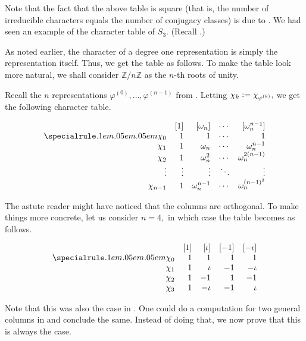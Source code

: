 Note that the fact that the above table is square (that is, the number of irreducible characters equals the number of conjugacy classes) is due to . We had seen an example of the character table of $S_3.$ (Recall .)

\begin{ex}
	As noted earlier, the character of a degree one representation is simply the representation itself. Thus, we get the table as follows. To make the table look more natural, we shall consider $\mathbb{Z}/n\mathbb{Z}$ as the $n$-th roots of unity.

	Recall the $n$ representations $\varphi^{(0)}, \ldots, \varphi^{(n-1)}$ from . Letting $\chi_k \vcentcolon= \chi_{\varphi^{(k)}},$ we get the following character table.

	\captionsetup{type=figure}
	\[\begin{array}{rrrrr}
		 & [1] & [\omega_n] & \cdots & [\omega_n^{n-1}]\\
		\thiccline
		\chi_0 & 1 & 1 & \cdots & 1\\
		\chi_1 & 1 & \omega_n & \cdots & \omega_n^{n-1} \\
		\chi_2 & 1 & \omega_n^2 & \cdots & \omega_n^{2(n - 1)}\\
		\vdots & \vdots & \vdots & \ddots & \vdots\\
		\chi_{n-1} & 1 & \omega_n^{n-1} & \cdots & \omega_n^{(n-1)^2}
	\end{array}\]
	 \label{tab:charZnZ}

	The astute reader might have noticed that the columns are orthogonal. To make things more concrete, let us consider $n = 4,$ in which case the table becomes as follows.

	\[\begin{array}{rrrrr}
		 & [1] & [\iota] & [-1] & [-\iota]\\
		\thiccline
		\chi_0 & 1 & 1 & 1 & 1\\
		\chi_1 & 1 & \iota & -1 & -\iota\\
		\chi_2 & 1 & -1 & 1 & -1\\
		\chi_3 & 1 & -\iota & -1 & \iota
	\end{array}\]

	Note that this was also the case in . One could do a computation for two general columns in  and conclude the same. Instead of doing that, we now prove that this is always the case.	
\end{ex}

